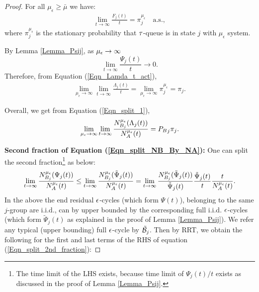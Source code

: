 \begin{proof}
For all $\mu_\epsilon \ge {\bar \mu}$ we have:  
\begin{eqnarray*}
	\lim_{t \to \infty} \frac{F_j(t)}{t} =    \pi_{j}^{\mu_\epsilon}   \ \ \ \mbox{ a.s.}  ,  
\end{eqnarray*}
where $\pi_{j}^{\mu_\epsilon} $ is the stationary probability that ${\tau}$-queue is in state $j$ with  $\mu_\epsilon$ system. 
%

%
By Lemma \ref{Lemma_Psij},  as ${\mu_\epsilon} \to \infty$ 
$$
\lim_{t \to \infty}   \frac{\Psi_j(t) }{t}  \to 0. 
$$
Therefore, from Equation (\ref{Eqn_Lamda_t_act}),
\begin{eqnarray*}
	\lim_{\mu_\epsilon \to \infty} \lim_{t \to \infty} \frac{ \Lambda_j(t)}{t} = \lim_{\mu_\epsilon \to \infty} \pi_{j}^{\mu_\epsilon} = \pi_{j}.
\end{eqnarray*}  



%
Overall, we get from Equation (\ref{Eqn_split_1}),
\begin{eqnarray*}
	\lim_{\mu_\epsilon \to \infty} \lim_{t \to \infty} \frac{ N_{B_j}^{{\mu_\epsilon}}(\Lambda_{j}(t))}{N_A^{{\mu_\epsilon}}(t)} = {P_B}_j \pi_{j}.
\end{eqnarray*}

{\bf Second fraction of Equation (\ref{Eqn_split_NB_By_NA}):}
One can split the second fraction\footnote{The time limit of the LHS exists, because time limit of $\Psi_j(t)/t$ exists as discussed in the proof of Lemma \ref{Lemma_Psij}. } as below:
\begin{eqnarray}
\label{Eqn_split_2nd_fraction}
\lim_{t \to \infty} \frac{N_{B_j}^{{\mu_\epsilon}}( \Psi_{j} (t))}{N_A^{{\mu_\epsilon}}(t)} \le 
\lim_{t \to \infty} \frac{N_{B_j}^{{\mu_\epsilon}}( {\tilde \Psi}_{j} (t))}{N_A^{{\mu_\epsilon}}(t)} 
= \lim_{t \to \infty} \frac{N_{B_j}^{{\mu_\epsilon}}( {\tilde \Psi}_{j} (t))}{{\tilde \Psi}_{j} (t)} \frac{{\tilde \Psi}_{j} (t)}{t} \frac{t}{N_A^{{\mu_\epsilon}}(t)}.
\end{eqnarray} 
%
In the above  the end residual ${ \epsilon }$-cycles (which form $\Psi(t)$), belonging to the same $j$-group  are i.i.d., can by upper bounded by the corresponding full i.i.d. ${ \epsilon }$-cycles (which form  ${\tilde \Psi}_{j} (t)$ as explained  in  the proof of  Lemma \ref{Lemma_Psij}). 
We refer any    typical (upper bounding)
  full ${ \epsilon }$-cycle by ${\tilde {\mathcal{B}}}_j$.
Then
by  RRT, we  obtain the following for the first and last terms of the RHS of equation (\ref{Eqn_split_2nd_fraction}):  


\end{proof}
